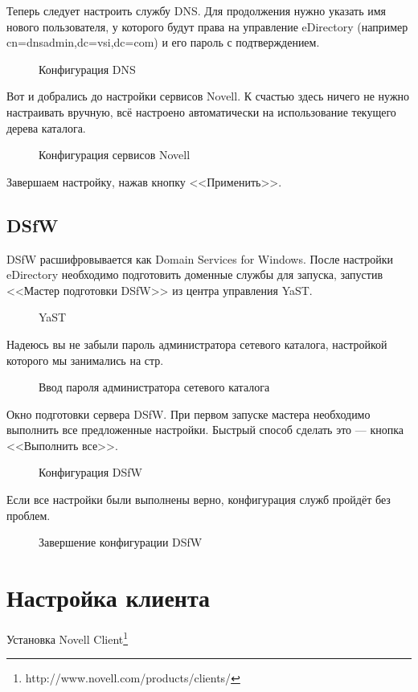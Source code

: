 Теперь следует настроить службу DNS. Для продолжения нужно указать имя нового пользователя, у которого будут права на управление eDirectory (например cn=dnsadmin,dc=vsi,dc=com) и его пароль с подтверждением.
\begin{figure}[H]
\caption{Конфигурация DNS}
\end{figure}
\clearpage

Вот и добрались до настройки сервисов Novell. К счастью здесь ничего не нужно настраивать вручную, всё настроено автоматически на использование текущего дерева каталога.
\begin{figure}[H]
\caption{Конфигурация сервисов Novell}
\end{figure}
Завершаем настройку, нажав кнопку <<Применить>>.
\clearpage

\section{DSfW}
DSfW расшифровывается как Domain Services for Windows. После настройки eDirectory необходимо подготовить доменные службы для запуска, запустив <<Мастер подготовки DSfW>> из центра управления YaST.
\begin{figure}[H]
\caption{YaST}
\end{figure}
\clearpage

Надеюсь вы не забыли пароль администратора сетевого каталога, настройкой которого мы занимались на стр.~\pageref{sec:eDirpass}
\begin{figure}[H]
\caption{Ввод пароля администратора сетевого каталога}
\end{figure}
\clearpage

Окно подготовки сервера DSfW. При первом запуске мастера необходимо выполнить все предложенные настройки. Быстрый способ сделать это --- кнопка <<Выполнить все>>.
\begin{figure}[H]
\caption{Конфигурация DSfW}
\end{figure}
\clearpage

Если все настройки были выполнены верно, конфигурация служб пройдёт без проблем.
\begin{figure}[H]
\caption{Завершение конфигурации DSfW}
\end{figure}
\clearpage

\chapter{Настройка клиента}
Установка Novell Client\footnote{http://www.novell.com/products/clients/}